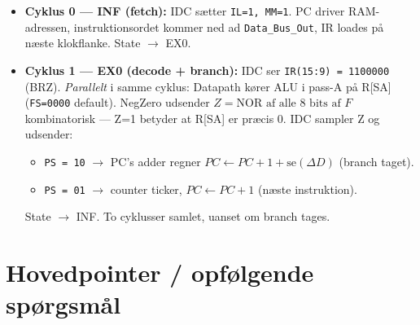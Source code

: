 \documentclass[11pt,a4paper]{article}
\begin{document}
\begin{itemize}
  \item \textbf{Cyklus 0 --- \textsc{INF} (fetch):}
        IDC sætter \texttt{IL=1, MM=1}.
        PC driver RAM-adressen, instruktionsordet kommer ned ad
        \texttt{Data\_Bus\_Out}, IR loades på næste klokflanke.
        State $\rightarrow$ \textsc{EX0}.

  \item \textbf{Cyklus 1 --- \textsc{EX0} (decode + branch):}
        IDC ser \texttt{IR(15:9) = 1100000} (BRZ).
        \emph{Parallelt} i samme cyklus: Datapath kører ALU i pass-A på
        R[SA] (\texttt{FS=0000} default). NegZero udsender
        \(Z = \text{NOR af alle 8 bits af } F\) kombinatorisk ---
        Z=1 betyder at R[SA] er præcis 0.
        IDC sampler Z og udsender:

        \begin{itemize}
          \item[\(Z = 1\):] \texttt{PS = 10} $\rightarrow$ PC's adder
                regner \(PC \leftarrow PC + 1 + \mathrm{se}(\Delta D)\) (branch taget).
          \item[\(Z = 0\):] \texttt{PS = 01} $\rightarrow$ counter ticker,
                \(PC \leftarrow PC + 1\) (næste instruktion).
        \end{itemize}

        State $\rightarrow$ \textsc{INF}. To cyklusser samlet, uanset om branch tages.
\end{itemize}

\section*{Hovedpointer / opfølgende spørgsmål}
\end{document}
